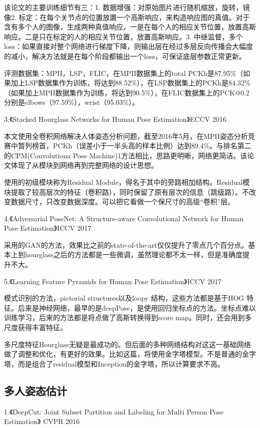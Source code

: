 \documentclass[11pt]{article}
\begin{document}
该论文的主要训练细节有三：1. 数据增强：对原始图片进行随机缩放，旋转，镜像2. 标定：在每个关节点的位置放置一个高斯响应，来构造响应图的真值。对于含有多个人的图像，生成两种真值响应，一是在每个人的相应关节位置，放置高斯响应。二是只在标定的人的相应关节位置，放置高斯响应。3. 中继监督，多个loss：如果直接对整个网络进行梯度下降，则输出层在经过多层反向传播会大幅度的减小，解决方法就是在每个阶段都输出一个loss，可保证底层参数正常更新。

评测数据集：MPII，LSP，FLIC，在MPII数据集上的total PCKh是87.95\%（如果加上LSP数据集作为训练，将达到88.52\%），在LSP数据集上的PCKh是84.32\%（如果加上MPII数据集作为训练，将达到90.5\%），在FLIC数据集上的PCK@0.2分别是elbows（97.59\%），wrist（95.03\%）。

3.《Stacked Hourglass Networks for Human Pose Estimation》ECCV 2016

本文使用全卷积网络解决人体姿态分析问题，截至2016年5月，在MPII姿态分析竞赛中暂列榜首，PCKh（误差小于一半头高的样本比例）达到89.4\%。与排名第二的CPM(Convolutiona Pose Machine)1方法相比，思路更明晰，网络更简洁。该论文体现了从模块到网络再到完整网络的设计思想。

使用的初级模块称为Residual Module，得名于其中的旁路相加结构。Residual模块提取了较高层次的特征（卷积路），同时保留了原有层次的信息（跳级路）。不改变数据尺寸，只改变数据深度。可以把它看做一个保尺寸的高级“卷积”层。

4.《Adversarial PoseNet: A Structure-aware Convolutional Network for Human Pose Estimation》ICCV 2017

采用的GAN的方法，效果比之前的state-of-the-art仅仅提升了零点几个百分点。基本上到hourglass之后的方法都是一些微调，虽然理论都不太一样，但是准确度提升不大。

5.《Learning Feature Pyramids for Human Pose Estimation》ICCV 2017

模式识别的方法，pictorial structures以及loopy 结构，这些方法都是基于HOG 特征。后来是神经网络，最早的是deepPose，是使用回归坐标点的方法。坐标点难以训练学习，后来的方法都是将点做了高斯转换得到score map。同时，还会用到多尺度获得丰富特征。

多尺度特征Hourglass无疑是最成功的。但后面的多种网络结构对这这一基础网络做了调整和优化，有更好的效果。比如这篇，将使用金字塔模型。不是普通的金字塔，而是组合了residual模型和Inception的金字塔，所以计算要求不高。
\subsection{多人姿态估计}
1.《DeepCut: Joint Subset Partition and Labeling for Multi Person Pose Estimation》 CVPR 2016
\end{document}

